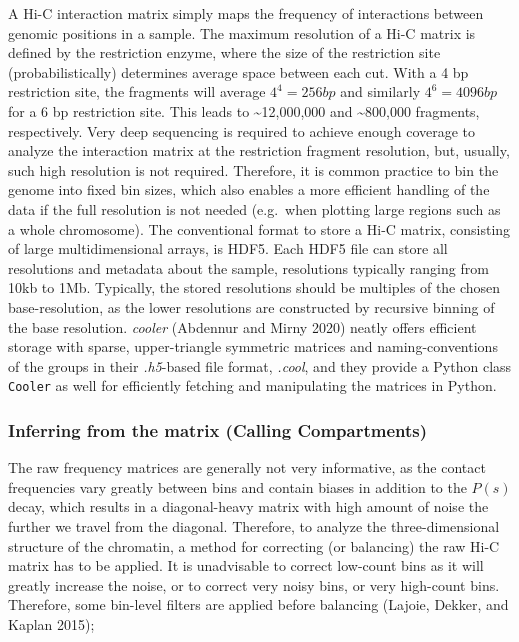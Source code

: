 \documentclass[
  11pt,
  a4paper,
]{scrbook}
\begin{document}
A Hi-C interaction matrix simply maps the frequency of interactions
between genomic positions in a sample. The maximum resolution of a Hi-C
matrix is defined by the restriction enzyme, where the size of the
restriction site (probabilistically) determines average space between
each cut. With a 4 bp restriction site, the fragments will average
\(4^4 = 256 bp\) and similarly \(4^6 = 4096 bp\) for a 6 bp restriction
site. This leads to \textasciitilde12,000,000 and \textasciitilde800,000
fragments, respectively. Very deep sequencing is required to achieve
enough coverage to analyze the interaction matrix at the restriction
fragment resolution, but, usually, such high resolution is not required.
Therefore, it is common practice to bin the genome into fixed bin sizes,
which also enables a more efficient handling of the data if the full
resolution is not needed (e.g.~when plotting large regions such as a
whole chromosome). The conventional format to store a Hi-C matrix,
consisting of large multidimensional arrays, is HDF5. Each HDF5 file can
store all resolutions and metadata about the sample, resolutions
typically ranging from 10kb to 1Mb. Typically, the stored resolutions
should be multiples of the chosen base-resolution, as the lower
resolutions are constructed by recursive binning of the base resolution.
\emph{cooler} (Abdennur and Mirny 2020) neatly offers efficient storage
with sparse, upper-triangle symmetric matrices and naming-conventions of
the groups in their \emph{.h5}-based file format, \emph{.cool}, and they
provide a Python class \texttt{Cooler} as well for efficiently fetching
and manipulating the matrices in Python.

\subsubsection{Inferring from the matrix (Calling
Compartments)}\label{inferring-from-the-matrix-calling-compartments}

The raw frequency matrices are generally not very informative, as the
contact frequencies vary greatly between bins and contain biases in
addition to the \(P(s)\) decay, which results in a diagonal-heavy matrix
with high amount of noise the further we travel from the diagonal.
Therefore, to analyze the three-dimensional structure of the chromatin,
a method for correcting (or balancing) the raw Hi-C matrix has to be
applied. It is unadvisable to correct low-count bins as it will greatly
increase the noise, or to correct very noisy bins, or very high-count
bins. Therefore, some bin-level filters are applied before balancing
(Lajoie, Dekker, and Kaplan 2015);
\end{document}
